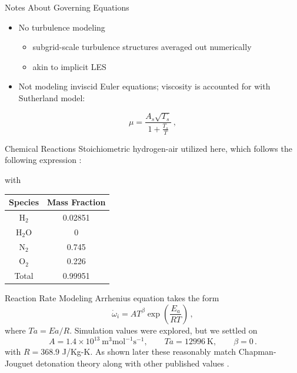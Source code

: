 \begin{frame}{Notes About Governing Equations}
\begin{itemize}
\item No turbulence modeling 
\begin{itemize}
    \item subgrid-scale turbulence structures averaged out numerically
    \item akin to implicit LES
\end{itemize}
\item Not modeling inviscid Euler equations; viscosity is accounted for with Sutherland \cite{sutherland} model:
\end{itemize}
\begin{equation}
\mu = \frac{A_s \sqrt{T_s}}{1 + \frac{T_s}{T}} \,,
\end{equation}
\end{frame}

\begin{frame}{Chemical Reactions}
Stoichiometric hydrogen-air utilized here, which follows the following expression \cite{kuo}:
\begin{center}
\end{center}
with
\begin{table}[t!]
\centering
\begin{tabular}{cc}
Species & Mass Fraction \\ \hline
H\(_2\) & 0.02851 \\ 
H\(_2\)O & 0 \\
N\(_2\) & 0.745 \\ 
O\(_2\) & 0.226 \\ \hline
Total & 0.99951 \\ 
\end{tabular}
\end{table}
\end{frame}

\begin{frame}{Reaction Rate Modeling}
Arrhenius equation \cite{arrhenius} takes the form \cite{christ} 
\begin{equation}
\dot{\omega}_i = AT^\beta \exp\left(\frac{E_a}{R T}\right)\,,
\end{equation}
where $Ta = Ea/R$. Simulation values were explored, but we settled on 
\begin{equation}
   A = 1.4 \times 10^{13} ~ \text{m}^3\text{mol}^{-1}\text{s}^{-1},
   \qquad 
   Ta = 12996 ~\text{K},
   \qquad
   \beta = 0\,.
\end{equation}
with \(R = 368.9\) J/Kg-K. As shown later these reasonably match Chapman-Jouguet detonation theory \cite{chapman} along with other published values \cite{towery1,hashemi}.
\end{frame}


